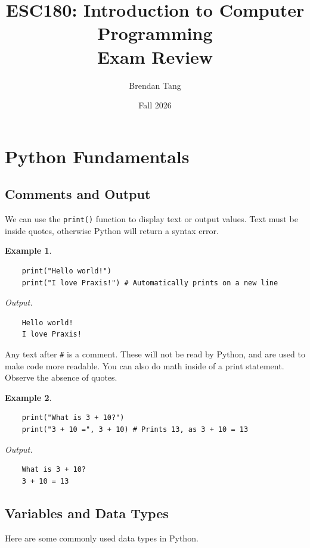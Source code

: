 \documentclass[11pt]{scrartcl}
\title{ESC180: Introduction to Computer Programming \\[0.1in] Exam Review}
\author{Brendan Tang}
\date{Fall 2026}
\theoremstyle{definition}
\newtheorem*{example}{Example}
\begin{document}
\maketitle
\thispagestyle{empty}

\tableofcontents

\newpage
\section{Python Fundamentals}
\subsection{Comments and Output}

We can use the \texttt{print()} function to display text or output values. Text must be inside quotes, 
otherwise Python will return a syntax error.

\begin{example}
    \
\begin{verbatim} 
    print("Hello world!") 
    print("I love Praxis!") # Automatically prints on a new line
\end{verbatim} 
    \textit{Output.}
\begin{verbatim}
    Hello world!
    I love Praxis!
\end{verbatim}
\end{example}

Any text after \texttt{#} is a comment. These will not be read by Python, and are used to make code
more readable. You can also do math inside of a print statement. Observe the absence of quotes.

\begin{example}
    \
\begin{verbatim}
    print("What is 3 + 10?") 
    print("3 + 10 =", 3 + 10) # Prints 13, as 3 + 10 = 13
\end{verbatim}
    \textit{Output.}
\begin{verbatim}
    What is 3 + 10?
    3 + 10 = 13
\end{verbatim}
\end{example}

\subsection{Variables and Data Types}

Here are some commonly used data types in Python.
\end{document}
